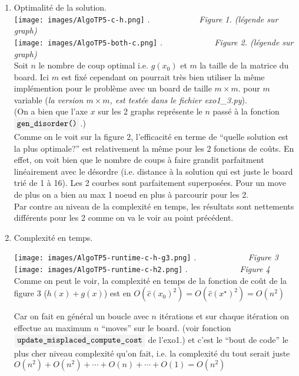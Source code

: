 \documentclass[french]{article}
\newcommand{\code}[1]{$\mbox{\colorbox{light-gray}{\texttt{#1}}}$}
\newcommand{\quo}[1]{``{#1}''}
\newcommand{\xsol}{x^{\star}}
\begin{document}
\begin{enumerate}
\item Optimalité de la solution. \\
\texttt{[image: images/AlgoTP5-c-h.png]}
$.\qquad \qquad \qquad $\textit{Figure 1. (légende sur graph)}\\
\texttt{[image: images/AlgoTP5-both-c.png]}
$.\qquad \qquad \qquad $ \textit{Figure 2. (légende sur graph)}\\

Soit $n$ le nombre de coup optimal i.e. $g(x_0)$ et $m$ la taille de la matrice du board. Ici $m$ est fixé cependant on pourrait très bien utiliser la même implémention pour le problème avec un board de taille $m \times m$. pour $m$ variable (\textit{la version $m \times m$, est testée dans le fichier exo1\_3.py}).\\
(On a bien que l'axe $x$ sur les 2 graphs représente le $n$ passé à la fonction \code{gen\_disorder()}.)\\

Comme on le voit sur la figure 2, l'efficacité en terme de \quo{quelle solution est la plus optimale?} est relativement la même pour les 2 fonctions de coûts. En effet, on voit bien que le nombre de coups à faire grandit parfaitment linéairement avec le désordre (i.e. distance à la solution qui est juste le board trié de 1 à 16). Les 2 courbes sont parfaitement superposées. 
Pour un move de plus on a bien au max 1 noeud en plus à parcourir pour les 2. \\
Par contre au niveau de la complexité en temps, les résultats sont nettements différents pour les 2 comme on va le voir au point précédent.

\item  Complexité en temps.

\texttt{[image: images/AlgoTP5-runtime-c-h-g3.png]}
$.\qquad \qquad \qquad $ \textit{Figure 3}\\

\texttt{[image: images/AlgoTP5-runtime-c-h2.png]}
$.\qquad \qquad \qquad $ \textit{Figure 4}\\

Comme on peut le voir, la complexité en temps de la fonction de coût de la figure 3 ($h(x)+g(x)$) est en $O(\hat{c}(x_0)^2)= O(\hat{c}(\xsol)^2) = O(n^2)$

Car on fait en général un boucle avec $n$ itérations et sur chaque itération on effectue au maximum $n$ \quo{moves} sur le board. (voir fonction \code{update\_misplaced\_compute\_cost} de l'exo1.)
et c'est le \quo{bout de code} le plus cher niveau complexité qu'on fait, i.e. la complexité du tout serait juste $O(n^2)+O(n^2)+ \cdots + O(n)+ \cdots + O(1) = O(n^2)$ \\


\end{enumerate}
\end{document}
